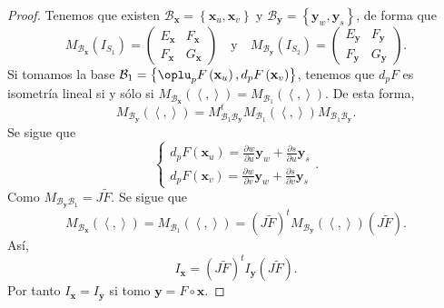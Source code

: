 \begin{proof}
	Tenemos que existen $\displaystyle \mathcal{B}_{ \textbf{x} } = \left\{ \textbf{x} _{u}, \textbf{x} _{v}\right\}  $ y $\displaystyle \mathcal{B}_{ \textbf{y} }= \left\{ \textbf{y} _{ w}, \textbf{y} _{s}\right\}  $, de forma que 
	\[M_{ \mathcal{B}_{ \textbf{x} }}\left(I_{S_{1}}\right)=\begin{pmatrix} E_{ \textbf{x} } & F_{ \textbf{x} } \\ F_{ \textbf{x} } & G_{ \textbf{x} } \end{pmatrix} \quad \text{y} \quad M_{ \mathcal{B}_{ \textbf{y} }}\left(I_{S_{2}}\right)=\begin{pmatrix} E_{ \textbf{y} } & F_{ \textbf{y} } \\ F_{ \textbf{y} } & G_{ \textbf{y} } \end{pmatrix} .\]
	Si tomamos la base $\displaystyle \mathcal{B}_{1}= \left\{ \oplu_{p}F\left( \textbf{x} _{u}\right), d _{p}F\left( \textbf{x} _{v}\right)\right\}  $, tenemos que $\displaystyle d _{p}F $ es isometría lineal si y sólo si $\displaystyle M_{ \mathcal{B}_{ \textbf{x} }}\left(\left\langle ,  \right\rangle \right)=M_{ \mathcal{B}_{1}}\left(\left\langle ,  \right\rangle \right) $. De esta forma, 
	\[M_{ \mathcal{B}_{ \textbf{y} }}\left(\left\langle ,  \right\rangle \right) = M_{\mathcal{B}_{1}\mathcal{B}_{ \textbf{y} }}^{t}M_{\mathcal{B}_{1}}\left(\left\langle ,  \right\rangle \right)M_{\mathcal{B}_{1}\mathcal{B}_{ \textbf{y} }} .\]
Se sigue que 
\[
\begin{cases}
d _{p}F\left( \textbf{x} _{u}\right)=\frac{\partial w}{\partial u} \textbf{y} _{w} + \frac{\partial s}{\partial u} \textbf{y} _{s} \\
d _{p}F\left( \textbf{x} _{v}\right)=\frac{\partial w}{\partial v} \textbf{y} _{w} + \frac{\partial s}{\partial v} \textbf{y} _{s}
\end{cases}
.\]
Como $\displaystyle M_{ \mathcal{B}_{ \textbf{y} }\mathcal{B}_{1}} = J\tilde{F} $. Se sigue que 
\[M_{\mathcal{B}_{ \textbf{x} }}\left(\left\langle ,  \right\rangle \right)=M_{ \mathcal{B}_{1}}\left(\left\langle ,  \right\rangle \right)=\left(J\tilde{F}\right)^{t}M_{ \mathcal{B}_{ \textbf{y} }}\left(\left\langle ,  \right\rangle \right)\left(J\tilde{F}\right) .\]
Así, 
\[I_{ \textbf{x} }=\left(J\tilde{F}\right)^{t}I_{ \textbf{y} }\left(J\tilde{F}\right) .\]
Por tanto $\displaystyle I_{ \textbf{x} }= I_{ \textbf{y} } $ si tomo $\displaystyle \textbf{y} =F\circ \textbf{x}  $.
\end{proof}
